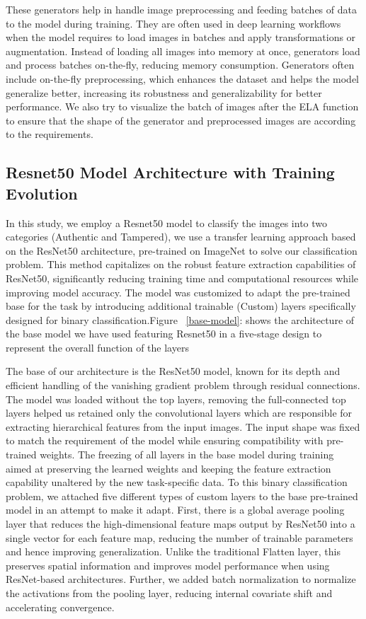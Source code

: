 \documentclass{ieeeaccess}
\begin{document}
These generators help in handle image preprocessing and feeding batches of data to the model during training. They are often used in deep learning workflows when the model requires to load images in batches and apply transformations or augmentation. Instead of loading all images into memory at once, generators load and process batches on-the-fly, reducing memory consumption. Generators often include on-the-fly preprocessing, which enhances the dataset and helps the model generalize better, increasing its robustness and generalizability for better performance.
We also try to visualize the batch of images after the ELA function to ensure that the 	shape of the generator and preprocessed images are according to the requirements.

\subsection{Resnet50 Model Architecture with Training Evolution }
In this study, we employ a Resnet50 model to classify the images into two categories (Authentic and Tampered), we use a transfer learning approach based on the ResNet50 architecture, pre-trained on ImageNet to solve our classification problem. This method capitalizes on the robust feature extraction capabilities of ResNet50, significantly reducing training time and computational resources while improving model accuracy. The model was customized to adapt the pre-trained base for the task by introducing additional trainable (Custom) layers specifically designed for binary classification.Figure ~\ref{base-model}: shows the architecture of the base model we have used featuring Resnet50 in a five-stage design to represent the overall function of the layers

The base of our architecture is the ResNet50 model, known for its depth and efficient handling of the vanishing gradient problem through residual connections. The model was loaded without the top layers, removing the full-connected top layers helped us retained only the convolutional layers which are responsible for extracting hierarchical features from the input images. The input shape was fixed to match the requirement of the model while ensuring compatibility with pre-trained weights. The freezing of all layers in the base model during training aimed at preserving the learned weights and keeping the feature extraction capability unaltered by the new task-specific data. To this binary classification problem, we attached five different types of custom layers to the base pre-trained model in an attempt to make it adapt. First, there is a global average pooling layer that reduces the high-dimensional feature maps output by ResNet50 into a single vector for each feature map, reducing the number of trainable parameters and hence improving generalization. Unlike the traditional Flatten layer, this preserves spatial information and improves model performance when using ResNet-based architectures. Further, we added batch normalization to normalize the activations from the pooling layer, reducing internal covariate shift and accelerating convergence. 
\end{document}
